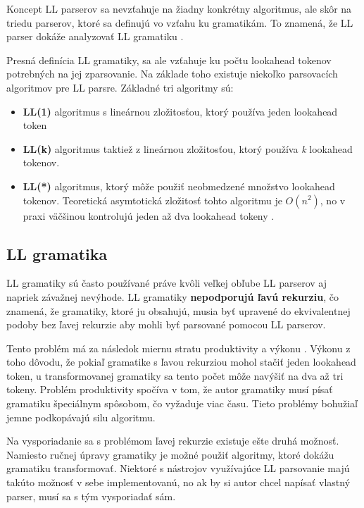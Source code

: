 Koncept LL parserov sa nevzťahuje na žiadny konkrétny algoritmus, ale skôr na triedu parserov, ktoré sa definujú vo vzťahu ku gramatikám. To znamená, že LL parser dokáže analyzovať LL gramatiku \cite{haberman:hard_parsing}.

Presná definícia LL gramatiky, sa ale vzťahuje ku počtu lookahead tokenov potrebných na jej zparsovanie. Na základe toho existuje niekoľko parsovacích algoritmov pre LL parsre. Základné tri algoritmy sú:
\begin{itemize}
\item \textbf{LL(1)} algoritmus s lineárnou zložitosťou, ktorý používa jeden lookahead token 
\item \textbf{LL(k)} algoritmus taktiež z lineárnou zložitosťou, ktorý používa \textit{k} lookahead tokenov.
\item \textbf{LL(*)} algoritmus, ktorý môže použiť neobmedzené množstvo lookahead tokenov. Teoretická asymtotická zložitosť tohto algoritmu je $O(n^2)$, no v praxi väčšinou kontrolujú jeden až dva lookahead tokeny \cite{LL}.
\end{itemize}

\subsection{LL gramatika}\label{ll_grammar}
LL gramatiky sú často používané práve kvôli veľkej obľube LL parserov aj napriek závažnej nevýhode. LL gramatiky \textbf{nepodporujú ľavú rekurziu}, čo znamená, že gramatiky, ktoré ju obsahujú, musia byť upravené do ekvivalentnej podoby bez ľavej rekurzie aby mohli byť parsované pomocou LL parserov.

Tento problém má za následok miernu stratu produktivity a výkonu \cite{tomassetti:parsing}. Výkonu z toho dôvodu, že pokiaľ gramatike s ľavou rekurziou mohol stačiť jeden lookahead token, u transformovanej gramatiky sa tento počet môže navýšiť na dva až tri tokeny. Problém produktivity spočíva v tom, že autor gramatiky musí písať gramatiku špeciálnym spôsobom, čo vyžaduje viac času. Tieto problémy bohužiaľ jemne podkopávajú silu algoritmu.

Na vysporiadanie sa s problémom ľavej rekurzie existuje ešte druhá možnosť. Namiesto ručnej úpravy gramatiky je možné použiť algoritmy, ktoré dokážu gramatiku transformovať. Niektoré s nástrojov využívajúce LL parsovanie majú takúto možnosť v sebe implementovanú, no ak by si autor chcel napísať vlastný parser, musí sa s tým vysporiadať sám.


